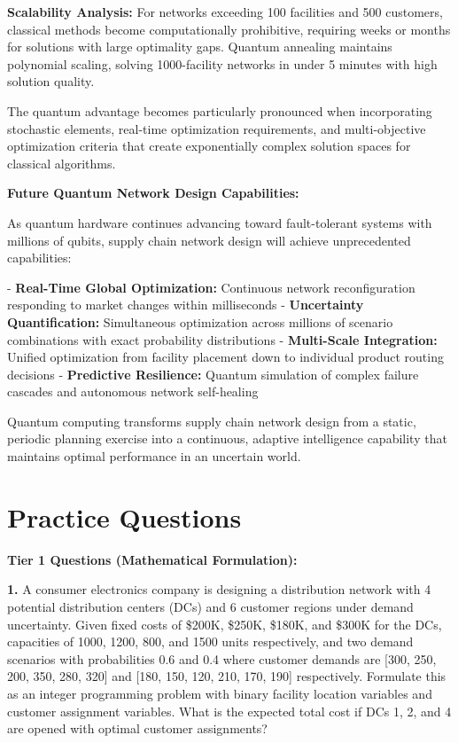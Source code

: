 \documentclass{article}
\begin{document}
\textbf{Scalability Analysis:} For networks exceeding 100 facilities and 500 customers, classical methods become computationally prohibitive, requiring weeks or months for solutions with large optimality gaps. Quantum annealing maintains polynomial scaling, solving 1000-facility networks in under 5 minutes with high solution quality.

The quantum advantage becomes particularly pronounced when incorporating stochastic elements, real-time optimization requirements, and multi-objective optimization criteria that create exponentially complex solution spaces for classical algorithms.

\textbf{Future Quantum Network Design Capabilities:}

As quantum hardware continues advancing toward fault-tolerant systems with millions of qubits, supply chain network design will achieve unprecedented capabilities:

- \textbf{Real-Time Global Optimization:} Continuous network reconfiguration responding to market changes within milliseconds
- \textbf{Uncertainty Quantification:} Simultaneous optimization across millions of scenario combinations with exact probability distributions  
- \textbf{Multi-Scale Integration:} Unified optimization from facility placement down to individual product routing decisions
- \textbf{Predictive Resilience:} Quantum simulation of complex failure cascades and autonomous network self-healing

Quantum computing transforms supply chain network design from a static, periodic planning exercise into a continuous, adaptive intelligence capability that maintains optimal performance in an uncertain world.

\section{Practice Questions}

\textbf{Tier 1 Questions (Mathematical Formulation):}

\textbf{1.} A consumer electronics company is designing a distribution network with 4 potential distribution centers (DCs) and 6 customer regions under demand uncertainty. Given fixed costs of \$200K, \$250K, \$180K, and \$300K for the DCs, capacities of 1000, 1200, 800, and 1500 units respectively, and two demand scenarios with probabilities 0.6 and 0.4 where customer demands are [300, 250, 200, 350, 280, 320] and [180, 150, 120, 210, 170, 190] respectively. Formulate this as an integer programming problem with binary facility location variables and customer assignment variables. What is the expected total cost if DCs 1, 2, and 4 are opened with optimal customer assignments?
\end{document}
